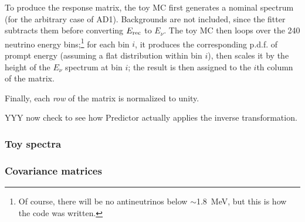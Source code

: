 \documentclass[../thesis.tex]{subfiles}
\begin{document}
To produce the response matrix, the toy MC first generates a nominal spectrum (for the arbitrary case of AD1). Backgrounds are not included, since the fitter subtracts them before converting $E_\mathrm{rec}$ to $E_\nu$. The toy MC then loops over the 240 neutrino energy bins;\footnote{Of course, there will be no antineutrinos below $\sim$1.8~MeV, but this is how the code was written.} for each bin $i$, it produces the corresponding p.d.f. of prompt energy (assuming a flat distribution within bin $i$), then scales it by the height of the $E_\nu$ spectrum at bin $i$; the result is then assigned to the $i$th column of the matrix.

Finally, each \emph{row} of the matrix is normalized to unity.

YYY now check to see how Predictor actually applies the inverse transformation.

\subsubsection{Toy spectra}

\subsubsection{Covariance matrices}
\end{document}
